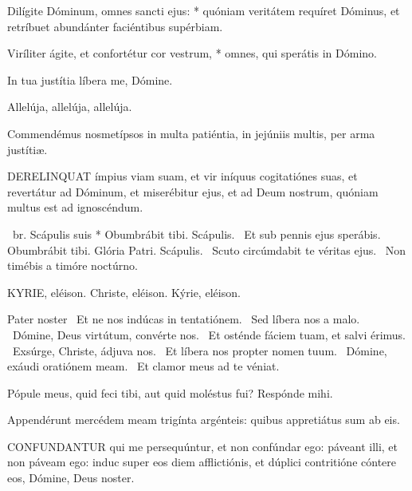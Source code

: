 Dilígite Dóminum, omnes sancti ejus: * quóniam veritátem requíret Dóminus, et retríbuet abundánter faciéntibus supérbiam.

Viríliter ágite, et confortétur cor vestrum, * omnes, qui sperátis in Dómino.

  In tua justítia líbera me, Dómine.

  Allelúja, allelúja, allelúja.



 Commendémus nosmetípsos in multa patiéntia, in jejúniis multis, per arma justítiæ.


\lettrine[lines=2]{D}{ERELINQUAT} ímpius viam suam, et vir iníquus cogitatiónes suas, et revertátur ad Dóminum, et miserébitur ejus, et ad Deum nostrum, quóniam multus est ad ignoscéndum.

\R\ br. Scápulis suis * Obumbrábit tibi. Scápulis. \V\ Et sub pennis ejus sperábis. Obumbrábit tibi. Glória Patri. Scápulis. \V\ Scuto circúmdabit te véritas ejus. \R\ Non timébis a timóre noctúrno.


KYRIE, eléison. Christe, eléison. Kýrie, eléison.

Pater noster  \V\ Et ne nos indúcas in tentatiónem. \R\ Sed líbera nos a malo. \V\ Dómine, Deus virtútum, convérte nos. \R\ Et osténde fáciem tuam, et salvi érimus. \V\ Exsúrge, Christe, ádjuva nos. \R\ Et líbera nos propter nomen tuum. \V\ Dómine, exáudi oratiónem meam. \R\ Et clamor meus ad te véniat.



 Pópule meus, quid feci tibi, aut quid moléstus fui? Respónde mihi.


 Appendérunt mercédem meam trigínta argénteis: quibus appretiátus sum ab eis.


\lettrine[lines=2]{C}{ONFUNDANTUR} qui me persequúntur, et non confúndar ego: páveant illi, et non páveam ego: induc super eos diem afflictiónis, et dúplici contritióne cóntere eos, Dómine, Deus noster.

